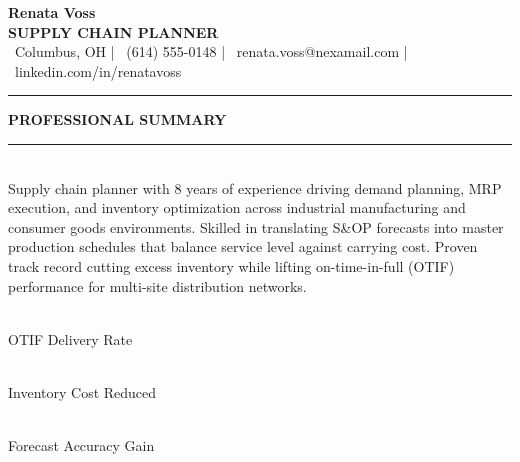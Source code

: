 \documentclass[10pt]{article}
\newcommand{\sectiontitle}[1]{%
  \vspace{2pt}
  {\color{navy}\fontsize{11.5}{13}\selectfont\bfseries #1}\\[-5pt]
  {\color{accent}\rule{\linewidth}{1.1pt}}\\[1pt]
}
\begin{document}
\small

\begin{center}
  {\color{navy}\fontsize{24}{26}\selectfont\bfseries Renata Voss}\\[3pt]
  {\color{accent}\fontsize{12}{14}\selectfont\bfseries SUPPLY CHAIN PLANNER}\\[5pt]
  {\small
    \faMapMarker\ Columbus, OH \quad|\quad
    \faPhone\ (614) 555-0148 \quad|\quad
    \faEnvelope\ renata.voss@nexamail.com \quad|\quad
    \faLinkedin\ linkedin.com/in/renatavoss
  }
\end{center}

\vspace{1pt}
{\color{navy}\rule{\linewidth}{1.6pt}}
\vspace{1pt}

\sectiontitle{PROFESSIONAL SUMMARY}
\small
Supply chain planner with 8 years of experience driving demand planning, MRP execution, and
inventory optimization across industrial manufacturing and consumer goods environments.
Skilled in translating S\&OP forecasts into master production schedules that balance service
level against carrying cost. Proven track record cutting excess inventory while lifting
on-time-in-full (OTIF) performance for multi-site distribution networks.

\vspace{2pt}

\begin{center}
\begin{minipage}{0.31\textwidth}
  \centering
  \begin{tcolorbox}[colback=lightbg,colframe=accent,boxrule=0.6pt,arc=2pt,left=3pt,right=3pt,top=2pt,bottom=2pt]
    \\
    {\scriptsize\color{graytext} OTIF Delivery Rate}
  \end{tcolorbox}
\end{minipage}\hfill
\begin{minipage}{0.31\textwidth}
  \centering
  \begin{tcolorbox}[colback=lightbg,colframe=accent,boxrule=0.6pt,arc=2pt,left=3pt,right=3pt,top=2pt,bottom=2pt]
    \\
    {\scriptsize\color{graytext} Inventory Cost Reduced}
  \end{tcolorbox}
\end{minipage}\hfill
\begin{minipage}{0.31\textwidth}
  \centering
  \begin{tcolorbox}[colback=lightbg,colframe=accent,boxrule=0.6pt,arc=2pt,left=3pt,right=3pt,top=2pt,bottom=2pt]
    \\
    {\scriptsize\color{graytext} Forecast Accuracy Gain}
  \end{tcolorbox}
\end{minipage}
\end{center}
\vspace{-4pt}
\end{document}
